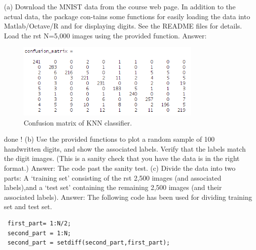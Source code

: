 \documentclass[paper=a4, fontsize=11pt]{scrartcl} %
\numberwithin{equation}{section} %
\numberwithin{figure}{section} %
\numberwithin{table}{section} %
\begin{document}
(a) Download the MNIST data from the course web page. In addition to the actual data, the package con-tains some functions for easily loading the data into Matlab/Octave/R and for displaying digits. See the README files for details. Load the rst N=5,000 images using the provided function.
\newline
\newline
Answer:
\newline\begin{figure}[h!]
  \centering
    \includegraphics[width=0.8\textwidth]{confusion_matrix_knn}
      \caption{Confusion matrix of KNN classifier.}
\end{figure}
done !
\newline
\newline
(b) Use the provided functions to plot a random sample of 100 handwritten digits, and show the associated
labels. Verify that the labels match the digit images. (This is a sanity check that you have the data is in
the right format.)
\newline
\newline
Answer:
\newline
The code past the sanity test.
\newline
\newline
(c) Divide the data into two parts: A `training set' consisting of the rst 2,500 images (and associated labels),and a `test set' containing the remaining 2,500 images (and their associated labels).
\newline
\newline
Answer:
\newline
The following code has been used for dividing training set and test set.
\begin{lstlisting}
 first_part= 1:N/2;
 second_part = 1:N;
 second_part = setdiff(second_part,first_part);
\end{lstlisting}
\end{document}
